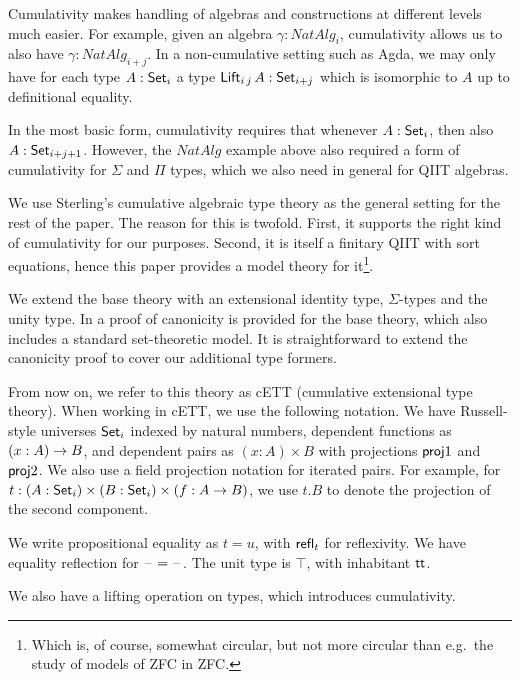 \documentclass{llncs}
\begin{document}
Cumulativity makes handling of algebras and constructions at different levels
much easier. For example, given an algebra $\gamma : NatAlg_i$, cumulativity
allows us to also have $\gamma : NatAlg_{i+j}$. In a non-cumulative setting such
as Agda, we may only have for each type $A : \Set_i$ a type $\mathsf{Lift}_{i\,j}\,A :
\Set_{i+j}$ which is isomorphic to $A$ up to definitional equality.

In the most basic form, cumulativity requires that whenever $A : \Set_i$, then
also $A : \Set_{i+j+1}$. However, the $NatAlg$ example above also required a
form of cumulativity for $\Sigma$ and $\Pi$ types, which we also need in general
for QIIT algebras.

We use Sterling's cumulative algebraic type theory \cite{TODO} as the general
setting for the rest of the paper. The reason for this is twofold. First, it
supports the right kind of cumulativity for our purposes. Second, it is itself a
finitary QIIT with sort equations, hence this paper provides a model theory for
it\footnote{Which is, of course, somewhat circular, but not more circular than
  e.g.\ the study of models of ZFC in ZFC.}.

We extend the base theory with an extensional identity type, $\Sigma$-types and
the unity type. In \cite{TODO} a proof of canonicity is provided for the base
theory, which also includes a standard set-theoretic model. It is
straightforward to extend the canonicity proof to cover our additional type
formers.

From now on, we refer to this theory as cETT (cumulative extensional type
theory). When working in cETT, we use the following notation. We
have Russell-style universes $\Set_i$ indexed by natural numbers, dependent
functions as $(x : A)\ra B$, and dependent pairs as $(x : A)\times B$ with
projections $\proj1$ and $\proj2$. We also use a field projection notation
for iterated pairs. For example, for $t : (A : \Set_i) \times (B : \Set_i)
\times (f : A \ra B)$, we use $t.B$ to denote the projection of the second
component.

We write propositional equality as $t = u$, with $\refl_t$ for reflexivity. We
have equality reflection for $\blank=\blank$. The unit type is $\top$, with
inhabitant $\tt$.

We also have a lifting operation on types, which introduces cumulativity.
\end{document}
